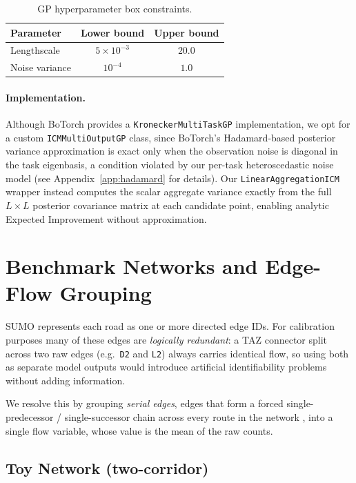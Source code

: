 \documentclass[11pt]{article}
\begin{document}
\begin{table}[h]
    \centering
    \caption{GP hyperparameter box constraints.}
    \label{tab:hp_bounds}
    \begin{tabular}{lcc}
        \toprule
        Parameter & Lower bound & Upper bound \\
        \midrule
        Lengthscale & $5 \times 10^{-3}$ & $20.0$ \\
        Noise variance & $10^{-4}$ & $1.0$ \\
        \bottomrule
    \end{tabular}
\end{table}


\paragraph{Implementation.}
Although BoTorch provides a \texttt{KroneckerMultiTaskGP} implementation, we opt for
a custom \texttt{ICMMultiOutputGP} class, since BoTorch's Hadamard-based posterior
variance approximation is exact only when the observation noise is diagonal in the
task eigenbasis, a condition violated by our per-task heteroscedastic noise model
(see Appendix~\ref{app:hadamard} for details). Our \texttt{LinearAggregationICM}
wrapper instead computes the scalar aggregate variance exactly from the full
$L \times L$ posterior covariance matrix at each candidate point, enabling analytic
Expected Improvement without approximation.

\section{Benchmark Networks and Edge-Flow Grouping}
\label{app:networks}

SUMO represents each road as one or more directed edge IDs.
For calibration purposes many of these edges are \emph{logically redundant}: a
TAZ connector split across two raw edges (e.g.\ \texttt{D2} and \texttt{L2})
always carries identical flow, so using both as separate model outputs would
introduce artificial identifiability problems without adding information.

We resolve this by grouping \emph{serial edges}, edges that form a forced
single-predecessor / single-successor chain across every route in the network
, into a single flow variable, whose value is the mean of the raw counts.




\subsection{Toy Network (two-corridor)}
\label{app:network_toy}
\end{document}
